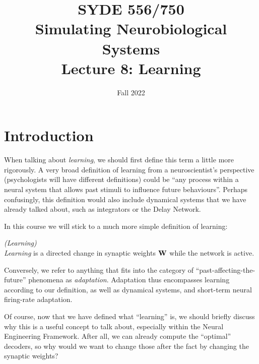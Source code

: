 \documentclass[10pt,letterpaper,oneside]{article}
\date{Fall 2022}
\title{SYDE 556/750 \\ Simulating Neurobiological Systems \\ Lecture 8: Learning}
\begin{document}

\section{Introduction}


When talking about \emph{learning}, we should first define this term a little more rigorously. A very broad definition of learning from a neuroscientist's perspective (psychologists will have different definitions) could be \enquote{any process within a neural system that allows past stimuli to influence future behaviours}. Perhaps confusingly, this definition would also include dynamical systems that we have already talked about, such as integrators or the Delay Network.

In this course we will stick to a much more simple definition of learning:
\begin{mdframed}
	\hfill\emph{(Learning)}\\
	\emph{Learning} is a directed change in synaptic weights ${\mathbf{W}}$ while the network is active.
\end{mdframed}
Conversely, we refer to anything that fits into the category of \enquote{past-affecting-the-future} phenomena as \emph{adaptation}. Adaptation thus encompasses learning according to our definition, as well as dynamical systems, and short-term neural firing-rate adaptation.

Of course, now that we have defined what \enquote{learning} is, we should briefly discuss why this is a useful concept to talk about, especially within the Neural Engineering Framework. After all, we can already compute the \enquote{optimal} decoders, so why would we want to change those after the fact by changing the synaptic weights?
\end{document}
